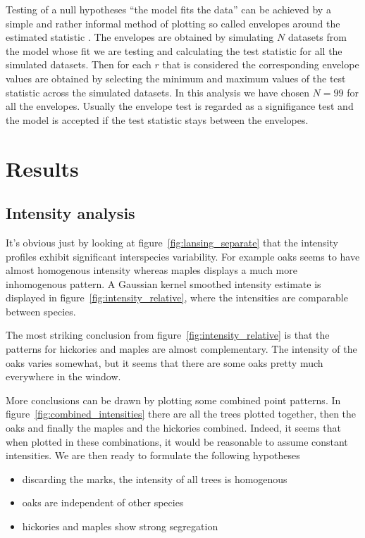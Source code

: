\documentclass[12pt,a4paper,oneside,article]{memoir}
\begin{document}
Testing of a null hypotheses ``the model fits the data'' can be achieved by a simple and rather
informal method of plotting so called envelopes around the estimated
statistic \cite{illian}. The envelopes are obtained by simulating
$N$ datasets from the model whose fit we are testing and calculating
the test statistic for all the simulated datasets. Then for each $r$
that is considered the corresponding envelope values are obtained by 
selecting the minimum and maximum values of the test statistic across the simulated datasets.
In this analysis we have chosen $N=99$ for all the envelopes.
Usually the envelope test is regarded as a signifigance test and the model
is accepted if the test statistic stays between the envelopes.


\section{Results}

\subsection{Intensity analysis}

It's obvious just by looking at figure~\ref{fig:lansing_separate} that 
the intensity profiles exhibit significant interspecies variability. For example
oaks seems to have almost homogenous intensity whereas maples
displays a much more inhomogenous pattern. A Gaussian kernel smoothed intensity 
estimate is displayed in figure~\ref{fig:intensity_relative}, where
the intensities are comparable between species. 

The most striking conclusion from figure~\ref{fig:intensity_relative} is that
the patterns for hickories and maples are almost complementary. The intensity
of the oaks varies somewhat, but it seems that there are some oaks pretty
much everywhere in the window.

More conclusions can be drawn by plotting some combined point patterns. In 
figure~\ref{fig:combined_intensities} there are all the trees plotted together, then
the oaks and finally the maples and the hickories combined. Indeed, it seems
that when plotted in these combinations, it would be reasonable to assume
constant intensities. We are then ready to formulate the following hypotheses
\begin{itemize}
  \item discarding the marks, the intensity of all trees is homogenous
  \item oaks are independent of other species
  \item hickories and maples show strong segregation
\end{itemize}
\end{document}
